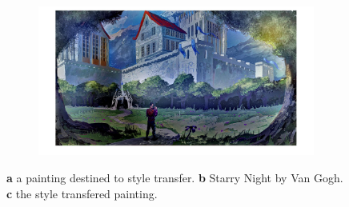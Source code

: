 \documentclass[a4paper]{iacas}
\begin{document}
\begin{figure}[!htbp]
	\begin{subfigure}[b]{0.65\textwidth}
		\includegraphics[width=\textwidth]{image_custom.jpg}
		\caption{}
		\label{fig:image_fused_custom}
	\end{subfigure}
	
	\caption{\textbf{a} a painting destined to style transfer. \textbf{b} Starry Night by Van Gogh. \textbf{c} the style transfered painting.}
	\label{fig:Custom}
\end{figure}
\end{document}
